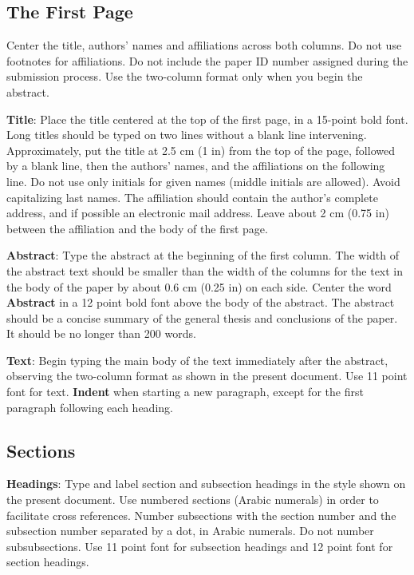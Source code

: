 \documentclass[11pt]{article}
\begin{document}
\subsection{The First Page}
\label{ssec:first}

Center the title, authors' names and affiliations across both
columns. Do not use footnotes for affiliations. Do not include the
paper ID number assigned during the submission process. Use the
two-column format only when you begin the abstract.

{\bf Title}: Place the title centered at the top of the first page, in
a 15-point bold font. Long titles should be typed on two lines without
a blank line intervening. Approximately, put the title at 2.5 cm (1 in) from
the top of the page, followed by a blank line, then the authors'
names, and the affiliations on the following line. Do not use only
initials for given names (middle initials are allowed). Avoid
capitalizing last names. The affiliation should contain the author's
complete address, and if possible an electronic mail address. Leave
about 2 cm (0.75 in) between the affiliation and the body of the first page.

{\bf Abstract}: Type the abstract at the beginning of the first
column. The width of the abstract text should be smaller than the
width of the columns for the text in the body of the paper by about
0.6 cm (0.25 in) on each side. Center the word {\bf Abstract} in a 12 point bold
font above the body of the abstract. The abstract should be a concise
summary of the general thesis and conclusions of the paper. It should
be no longer than 200 words.

{\bf Text}: Begin typing the main body of the text immediately after the
abstract, observing the two-column format as shown in the present document.
Use 11 point font for text. {\bf Indent} when starting a new paragraph, except
for the first paragraph following each heading.


\subsection{Sections}

{\bf Headings}: Type and label section and subsection headings in the
style shown on the present document.  Use numbered sections (Arabic
numerals) in order to facilitate cross references. Number subsections
with the section number and the subsection number separated by a dot,
in Arabic numerals. Do not number subsubsections. Use 11 point font for
subsection headings and 12 point font for section headings.
\end{document}
